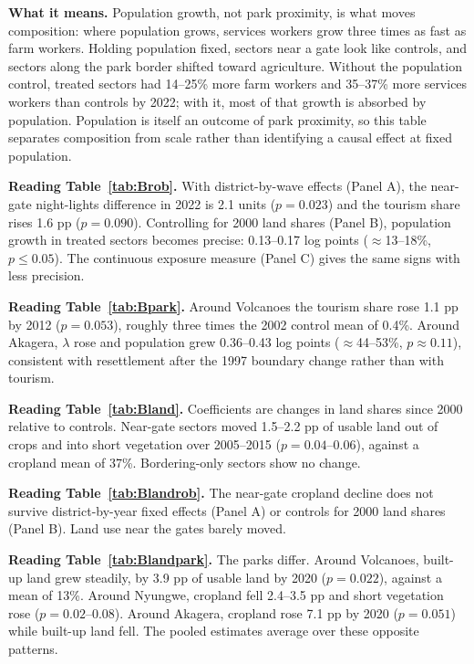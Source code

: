 \documentclass[11pt]{article}
\begin{document}
\medskip\noindent\textbf{What it means.} Population growth, not park proximity, is what moves composition: where population grows, services workers grow three times as fast as farm workers. Holding population fixed, sectors near a gate look like controls, and sectors along the park border shifted toward agriculture. Without the population control, treated sectors had 14--25\% more farm workers and 35--37\% more services workers than controls by 2022; with it, most of that growth is absorbed by population. Population is itself an outcome of park proximity, so this table separates composition from scale rather than identifying a causal effect at fixed population.


\noindent\textbf{Reading Table~\ref{tab:Brob}.} With district-by-wave effects (Panel A), the near-gate night-lights difference in 2022 is 2.1 units ($p=0.023$) and the tourism share rises 1.6 pp ($p=0.090$). Controlling for 2000 land shares (Panel B), population growth in treated sectors becomes precise: 0.13--0.17 log points ($\approx$13--18\%, $p\le0.05$). The continuous exposure measure (Panel C) gives the same signs with less precision.


\noindent\textbf{Reading Table~\ref{tab:Bpark}.} Around Volcanoes the tourism share rose 1.1 pp by 2012 ($p=0.053$), roughly three times the 2002 control mean of 0.4\%. Around Akagera, $\lambda$ rose and population grew 0.36--0.43 log points ($\approx$44--53\%, $p\approx0.11$), consistent with resettlement after the 1997 boundary change rather than with tourism.


\noindent\textbf{Reading Table~\ref{tab:Bland}.} Coefficients are changes in land shares since 2000 relative to controls. Near-gate sectors moved 1.5--2.2 pp of usable land out of crops and into short vegetation over 2005--2015 ($p=0.04$--$0.06$), against a cropland mean of 37\%. Bordering-only sectors show no change.

\noindent\textbf{Reading Table~\ref{tab:Blandrob}.} The near-gate cropland decline does not survive district-by-year fixed effects (Panel A) or controls for 2000 land shares (Panel B). Land use near the gates barely moved.




\noindent\textbf{Reading Table~\ref{tab:Blandpark}.} The parks differ. Around Volcanoes, built-up land grew steadily, by 3.9 pp of usable land by 2020 ($p=0.022$), against a mean of 13\%. Around Nyungwe, cropland fell 2.4--3.5 pp and short vegetation rose ($p=0.02$--$0.08$). Around Akagera, cropland rose 7.1 pp by 2020 ($p=0.051$) while built-up land fell. The pooled estimates average over these opposite patterns.
\end{document}
